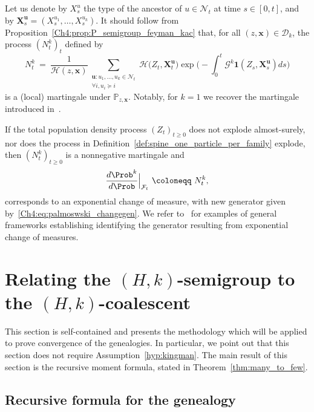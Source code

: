 \begin{refsegment}
\begin{rem}
  Let us denote by $X^u_s$ the type of the ancestor of $u \in \mathcal{N}_t$ at time $s \in [0,t]$, and by $\bm{X}_s^{\bm{u}} = (X^{u_1}_s, \dots, X^{u_k}_s)$. 
  It should follow from Proposition~\ref{Ch4:prop:P_semigroup_feyman_kac} that, for all $(z,\bm x)\in\mathscr{D}_{k}$, the process $(N^k_t)_t$ defined by
  \[
N^k_t\ =\ \frac{1}{\mathcal{H}(z,\bm x)}\sum_{ \substack{\bm u: u_1, \ldots, u_k \in \mathcal{N}_t\\ \forall i, u_i\succcurlyeq i}}\mathcal{H}\big(Z_t,\bm X^{\bm u}_t \big)\exp\Big(-\int_{0}^t\mathcal{G}^k\bm{1}(Z_s, \bm{X}^{\bm u}_s) ds \Big)
  \] 
  is a (local) martingale under $\mathbb{P}_{z,\bm{x}}$. Notably, for $k=1$ we recover the martingale introduced in~\cite{Bansaye}.
  
  If the total population density process $(Z_t)_{t \geq 0}$ does not explode almost-surely, nor does the process in Definition~\ref{def:spine_one_particle_per_family}  explode, then $(N^k_t)_{t \geq 0}$ is a nonnegative martingale and
  \[
  \frac{d\Prob^k}{d\Prob}\Big|_{\mathcal{F}_t}\ \coloneqq\ N^k_t,
  \] corresponds to an exponential change of measure, with new generator given by~\eqref{Ch4:eq:palmoswski_changegen}.
  We refer to~\cite{palmowski_technique_2002} for examples of general frameworks establishing identifying the generator resulting from exponential change of measures.
\end{rem}


\section{Relating the $(H,k)$-semigroup to the  $(H,k)$-coalescent}
\label{Ch4:sec:methodology}

This section is self-contained and presents the methodology which will be applied to prove convergence of the genealogies. In particular, we  point out that this section does not require Assumption~\ref{hyp:kingman}. The main result of this section is the recursive moment formula, stated in Theorem~\ref{thm:many_to_few}. 




\subsection{Recursive formula for the genealogy}\label{Ch4:sec:many_to_few}


\end{refsegment}
